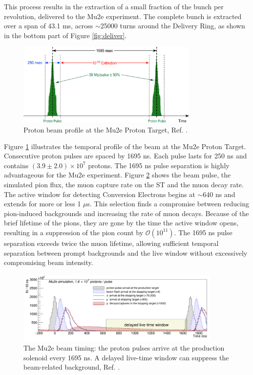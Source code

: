 This process results in the extraction of a small fraction of the bunch per revolution, 
delivered to the Mu2e experiment. The complete bunch is extracted over a span of 43.1 ms, 
across $\sim$25000 turns around the Delivery Ring, as shown in the bottom part of Figure \ref{fig:deliver}.
\begin{figure}[!h]
\centering
\includegraphics[width =0.8\textwidth]{figures/png/Screenshot_20240301_151148.png}
\caption[Proton beam profile.]{Proton beam profile at the Mu2e Proton Target, Ref. \cite{accelerator}.}
\label{fig:beamprofile}
\end{figure}
Figure \ref{fig:beamprofile} illustrates the temporal profile of the beam at the Mu2e Proton Target. Consecutive proton pulses are spaced by 1695 ns. Each pulse lasts for 250 ns and contains $(3.9 \pm 2.0 )\times 10^7$ protons. The 1695 ns pulse separation is highly advantageous for the Mu2e experiment. Figure \ref{fig:beamwindow} shows the beam pulse, 
the simulated pion flux, the muon capture rate on the ST and the muon decay rate. The active window for detecting Conversion Electrons begins at $\sim$640 ns and extends for more or less 1 $\mu$s. This selection finds a compromise between reducing pion-induced backgrounds  and increasing the rate of muon decays. Because of the brief lifetime of the pions, they are gone by the time the active window opens, resulting in a suppression of the pion count by $\mathcal{O}(10^{11})$. The 1695 ns pulse separation exceeds twice the muon lifetime, allowing sufficient temporal separation between prompt backgrounds and the live window without excessively compromising beam intensity.
\begin{figure}[!h]
\centering
\includegraphics[width =0.9\textwidth]{figures/png/Screenshot_20240301_164649.png}
\caption[The Mu2e beam timing]{The Mu2e beam timing: the proton pulses arrive at the production solenoid every 1695 ns. A delayed live-time window can suppress the beam-related background, Ref. \cite{universe9010054}.}
\label{fig:beamwindow}
\end{figure}
